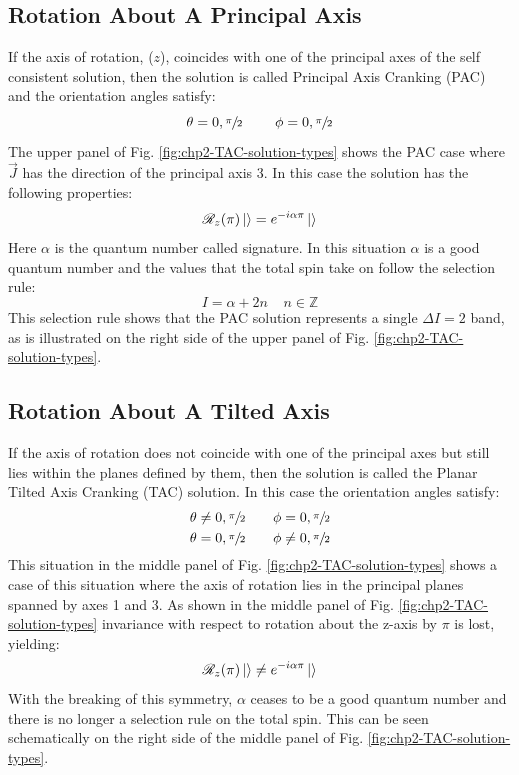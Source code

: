 \subsection{Rotation About A Principal Axis}
If the axis of rotation, ($z$), coincides with one of the principal axes of the self consistent solution, then the solution is called Principal Axis Cranking (PAC) and the orientation angles satisfy:
\begin{equation}
\label{eqn:chp2-PAC-angle-conditions}
\theta = 0, \sfrac{\pi}{2}~~~~~~~ \phi= 0, \sfrac{\pi}{2}
\end{equation}
The upper panel of Fig. \ref{fig:chp2-TAC-solution-types} shows the PAC case where $\vec{J}$ has the direction of the principal axis 3. In this case the solution has the following properties:
\begin{equation}
\label{eqn:chp2=TAC-PAC-sol-prop}
\mathscr{R}_z(\pi)\Ket{}=e^{-i\alpha\pi}\Ket{}
\end{equation}
Here $\alpha$ is the quantum number called signature. In this situation $\alpha$ is a good quantum number and the values that the total spin take on follow the selection rule:
\begin{equation}
\label{eqn:chp2=TAC-PAC-spin-sel-rule}
I=\alpha+2n ~~~~~n\in{}\mathds{Z}
\end{equation}
This selection rule shows that the PAC solution represents a single $\Delta{}I=2$ band, as is illustrated on the right side of the upper panel of Fig. \ref{fig:chp2-TAC-solution-types}.

\subsection{Rotation About A Tilted Axis}
If the axis of rotation does not coincide with one of the principal axes but still lies within the planes defined by them, then the solution is called the Planar Tilted Axis Cranking (TAC) solution. In this case the orientation angles satisfy:
\begin{align}
\theta &\neq{} 0, \sfrac{\pi}{2} ~~~~~~ \phi=0, \sfrac{\pi}{2}\\
\theta &= 0, \sfrac{\pi}{2} ~~~~~~ \phi\neq{}0, \sfrac{\pi}{2}
\end{align}
This situation in the middle panel of Fig. \ref{fig:chp2-TAC-solution-types} shows a case of this situation where the axis of rotation lies in the principal planes spanned by axes 1 and 3. As shown in the middle panel of Fig. \ref{fig:chp2-TAC-solution-types} invariance with respect to rotation about the z-axis by $\pi$ is lost, yielding:
\begin{equation}
\label{eqn:chp2=TAC-TAC-sol-prop}
\mathscr{R}_z(\pi)\Ket{}\neq{}e^{-i\alpha\pi}\Ket{}
\end{equation}
With the breaking of this symmetry, $\alpha$ ceases to be a good quantum number and there is no longer a selection rule on the total spin. This can be seen schematically on the right side of the middle panel of Fig. \ref{fig:chp2-TAC-solution-types}.


